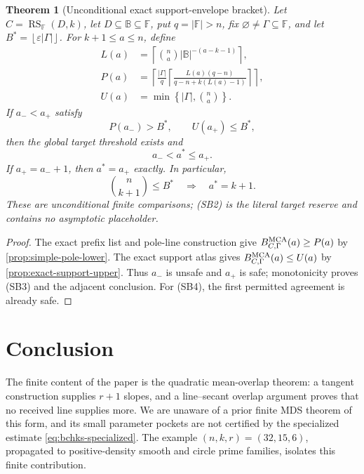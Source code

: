 \documentclass[11pt,a4paper]{amsart}
\numberwithin{equation}{section}
\newtheorem{theorem}{Theorem}[section]
\theoremstyle{remark}
\DeclareMathOperator{\RS}{RS}
\newcommand{\F}{\mathbb F}
\newcommand{\B}{\mathbb B}
\newcommand{\eps}{\varepsilon}
\newcommand{\abs}[1]{\lvert #1\rvert}
\newcommand{\floor}[1]{\left\lfloor #1\right\rfloor}
\newcommand{\ceil}[1]{\left\lceil #1\right\rceil}
\begin{document}
\begin{theorem}[Unconditional exact support-envelope bracket]
\label{thm:unconditional-support-envelope-bracket}
Let \(C=\RS_\F(D,k)\), let \(D\subseteq\B\subseteq\F\), put
\(q=\abs\F>n\), fix \(\varnothing\ne\Gamma\subseteq\F\), and let
\(B^*=\floor{\eps\abs\Gamma}\).  For \(k+1\le a\le n\), define
\[
 \begin{split}
 L(a)&=\ceil{\binom na\abs\B^{-(a-k-1)}},\\
 P(a)&=\left\lceil\frac{\abs\Gamma}{q}
       \left\lceil\frac{L(a)(q-n)}
       {q-n+k(L(a)-1)}\right\rceil\right\rceil,\\
 U(a)&=\min\left\{\abs\Gamma,\binom na\right\}.
 \end{split}                                       \tag{SB1}
\]
If \(a_-<a_+\) satisfy
\[
                         P(a_-)>B^*,\qquad U(a_+)\le B^*, \tag{SB2}
\]
then the global target threshold exists and
\[
                         a_-<a^*\le a_+.            \tag{SB3}
\]
If \(a_+=a_-+1\), then \(a^*=a_+\) exactly.  In particular,
\[
                  \binom n{k+1}\le B^*\quad\Longrightarrow\quad
                  a^*=k+1.                         \tag{SB4}
\]
These are unconditional finite comparisons; \textup{(SB2)} is the
literal target reserve and contains no asymptotic placeholder.
\end{theorem}

\begin{proof}
The exact prefix list and pole-line construction give
\(B_{C,\Gamma}^{\rm MCA}(a)\ge P(a)\) by
\cref{prop:simple-pole-lower}.  The exact support atlas gives
\(B_{C,\Gamma}^{\rm MCA}(a)\le U(a)\) by
\cref{prop:exact-support-upper}.  Thus \(a_-\) is unsafe and \(a_+\) is
safe; monotonicity proves \textup{(SB3)} and the adjacent conclusion.
For \textup{(SB4)}, the first permitted agreement is already safe.
\end{proof}



\section{Conclusion}\label{sec:conclusion}

The finite content of the paper is the quadratic mean-overlap theorem: a
tangent construction supplies \(r+1\) slopes, and a line--secant overlap
argument proves that no received line supplies more.  We are unaware of
a prior finite MDS theorem of this form, and its small parameter pockets
are not certified by the specialized estimate
\eqref{eq:bchks-specialized}.  The example
\((n,k,r)=(32,15,6)\), propagated to positive-density smooth and circle
prime families, isolates this finite contribution.
\end{document}
